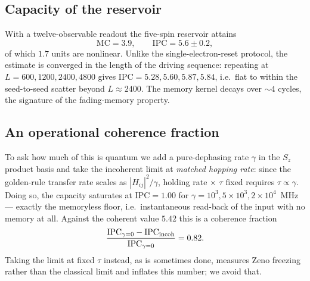 \documentclass[aps,prx,reprint,superscriptaddress,nofootinbib,floatfix]{revtex4-2}
\begin{document}
\subsection{Capacity of the reservoir}

With a twelve-observable readout the five-spin reservoir attains
\begin{equation*}
\mathrm{MC}=3.9,\qquad \mathrm{IPC}=5.6\pm0.2 ,
\end{equation*}
of which $1.7$ units are nonlinear. Unlike the single-electron-reset protocol, the
estimate is converged in the length of the driving sequence: repeating at
$L=600,1200,2400,4800$ gives $\mathrm{IPC}=5.28,5.60,5.87,5.84$, i.e.\ flat to
within the seed-to-seed scatter beyond $L\approx2400$. The memory kernel decays
over $\sim4$ cycles, the signature of the fading-memory property.

\subsection{An operational coherence fraction}

To ask how much of this is quantum we add a pure-dephasing rate $\gamma$
in the $S_z$ product basis and take the incoherent limit at \emph{matched hopping
rate}: since the golden-rule transfer rate scales as $|H_{ij}|^2/\gamma$, holding
rate$\,\times\,\tau$ fixed requires $\tau\propto\gamma$. Doing so, the capacity
saturates at $\mathrm{IPC}=1.00$ for $\gamma=10^{3},5\times10^{3},2\times10^{4}$~MHz
--- exactly the memoryless floor, i.e.\ instantaneous read-back of the input with no
memory at all. Against the coherent value $5.42$ this is a coherence fraction
\begin{equation}
\frac{\mathrm{IPC}_{\gamma=0}-\mathrm{IPC}_{\rm incoh}}{\mathrm{IPC}_{\gamma=0}}
=0.82 .
\end{equation}
Taking the limit at fixed $\tau$ instead, as is sometimes done, measures Zeno
freezing rather than the classical limit and inflates this number; we avoid that.
\end{document}
